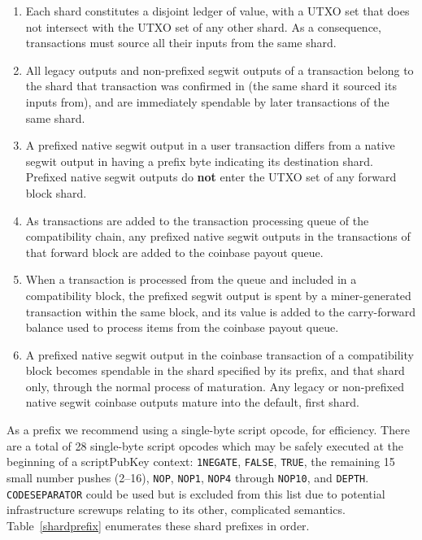 \begin{enumerate}

  \item

    Each shard constitutes a disjoint ledger of value, with a UTXO set
    that does not intersect with the UTXO set of any other shard.  As
    a consequence, transactions must source all their inputs from the
    same shard.

  \item

    All legacy outputs and non-prefixed segwit outputs of a
    transaction belong to the shard that transaction was confirmed in
    (the same shard it sourced its inputs from), and are immediately
    spendable by later transactions of the same shard.

  \item

    A prefixed native segwit output in a user transaction differs from
    a native segwit output in having a prefix byte indicating its
    destination shard.  Prefixed native segwit outputs do \textbf{not}
    enter the UTXO set of any forward block shard.

  \item

    As transactions are added to the transaction processing queue of
    the compatibility chain, any prefixed native segwit outputs in the
    transactions of that forward block are added to the coinbase
    payout queue.

  \item

    When a transaction is processed from the queue and included in a
    compatibility block, the prefixed segwit output is spent by a
    miner-generated transaction within the same block, and its value
    is added to the carry-forward balance used to process items from
    the coinbase payout queue.

  \item

    A prefixed native segwit output in the coinbase transaction of a
    compatibility block becomes spendable in the shard specified by
    its prefix, and that shard only, through the normal process of
    maturation.  Any legacy or non-prefixed native segwit coinbase
    outputs mature into the default, first shard.

\end{enumerate}

As a prefix we recommend using a single-byte script opcode, for
efficiency.  There are a total of 28 single-byte script opcodes which
may be safely executed at the beginning of a scriptPubKey context:
{\tt 1NEGATE}, {\tt FALSE}, {\tt TRUE}, the remaining \num{15} small
number pushes (\numrange{2}{16}), {\tt NOP}, {\tt NOP1}, {\tt NOP4}
through {\tt NOP10}, and {\tt DEPTH}.  {\tt CODESEPARATOR} could be
used but is excluded from this list due to potential infrastructure
screwups relating to its other, complicated semantics.
Table~\ref{shardprefix} enumerates these shard prefixes in order.

